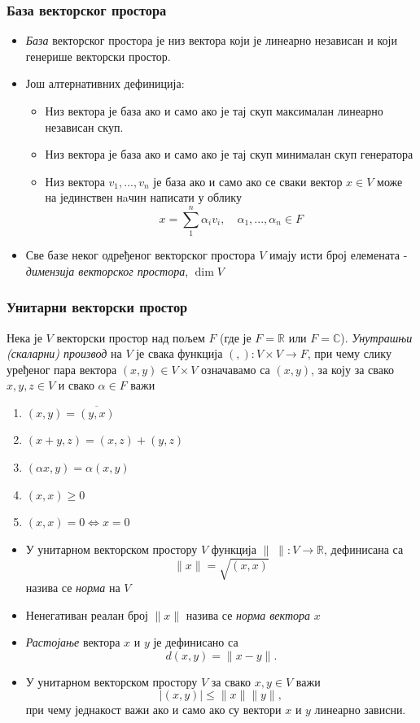 \documentclass{beamer}
\theoremstyle{plain}
\theoremstyle{definition}
\begin{document}
\begin{frame}
\frametitle{База векторског простора}
\begin{itemize}
\item \emph{База} векторског простора је низ вектора који је линеарно независан и који генерише векторски простор.
\item Још алтернативних дефиниција:
\begin{itemize}
  \item Низ вектора је база ако и само ако је тај скуп максималан линеарно независан скуп.
  \item Низ вектора је база ако и само ако је тај скуп минималан скуп генератора
  \item Низ вектора $v_1, ..., v_n$ је база ако и само ако се сваки вектор $x\in V$ може на јединствен нaчин написати у облику $$x = \sum_1^n\alpha_i v_i, \quad \alpha_1, ..., \alpha_n\in F$$
\end{itemize}
\item Све базе неког одређеног векторског простора $V$ имају исти број елемената - \emph{димензија векторског простора}, $\operatorname{dim} V$
\end{itemize}
\end{frame}

\begin{frame}
\frametitle{Унитарни векторски простор}
Нека је $V$ векторски простор над пољем $F$ (где је $F=\mathbb{R}$ или $F=\mathbb{C}$). \emph{Унутрашњи (скаларни) производ} на $V$ је свака функција $(,):V\times V\to F$, при чему слику уређеног пара вектора $(x, y)\in V\times V$ означавамо са $(x, y)$, за коју за свако $x, y, z\in V$ и свако $\alpha \in F$ важи
\begin{enumerate}
  \item $(x, y) = \overline{(y, x)}$
  \item $(x+y, z) = (x, z)+(y, z)$
  \item $(\alpha x, y) = \alpha (x, y)$
  \item $(x, x)\geq 0$
  \item $(x, x) = 0 \Leftrightarrow x=0$
\end{enumerate}
\end{frame}

\begin{frame}
\begin{itemize}
\item У унитарном векторском простору $V$ функција $\|\;\|:V\to \mathbb{R}$, дефинисана са $$\|x\| = \sqrt{(x, x)}$$ назива се \emph{норма} на $V$
\item Ненегативан реалан број $\|x\|$ назива се \emph{норма вектора} $x$
\item \emph{Растојање} вектора $x$ и $y$ је дефинисано са $$d(x, y) = \|x-y\|.$$
\item У унитарном векторском простору $V$ за свако $x, y\in V$ важи
$$|(x, y)|\leq\|x\|\|y\|,$$
при чему једнакост важи ако и само ако су вектори $x$ и $y$ линеарно зависни.
\end{itemize}

\end{frame}
\end{document}
